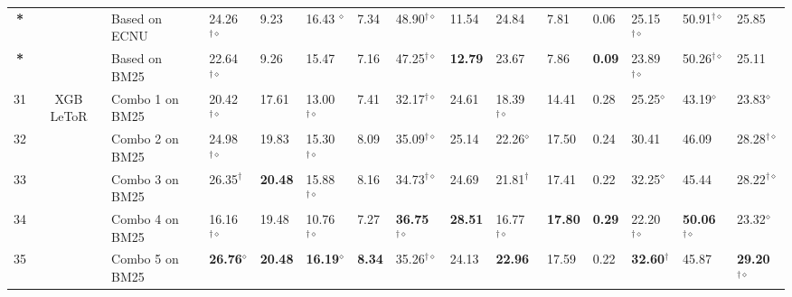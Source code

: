 \begin{table*}[ht!]
{\begin{tabular}{cclllllllllllll}
\textbf{*} &  & Based on ECNU  & 24.26$^{\dagger\diamond}$  & 9.23 & 16.43 $^{\diamond}$  & 7.34 & 48.90$^{\dagger\diamond}$  & 11.54 & 24.84  & 7.81 & 0.06 & 25.15$^{\dagger\diamond}$  & 50.91$^{\dagger\diamond}$  & 25.85\tabularnewline
\textbf{*} &  & Based on BM25  & 22.64$^{\dagger\diamond}$  & 9.26 & 15.47  & 7.16 & 47.25$^{\dagger\diamond}$  & \textbf{12.79} & 23.67  & 7.86 & \textbf{0.09} & 23.89$^{\dagger\diamond}$  & 50.26$^{\dagger\diamond}$  & 25.11\tabularnewline
\midrule 
31  & \multirow{5}{*}{XGB LeToR}  & Combo 1 on BM25  & 20.42$^{\dagger\diamond}$  & 17.61  & 13.00$^{\dagger\diamond}$  & 7.41  & 32.17$^{\dagger\diamond}$  & 24.61  & 18.39$^{\dagger\diamond}$  & 14.41  & 0.28  & 25.25$^{\diamond}$  & 43.19$^{\diamond}$  & 23.83$^{\diamond}$\tabularnewline
32  &  & Combo 2 on BM25  & 24.98$^{\dagger\diamond}$  & 19.83  & 15.30$^{\dagger\diamond}$  & 8.09  & 35.09$^{\dagger\diamond}$  & 25.14  & 22.26$^{\diamond}$  & 17.50  & 0.24  & 30.41  & 46.09  & 28.28$^{\dagger\diamond}$ \tabularnewline
33  &  & Combo 3 on BM25  & 26.35$^{\dagger}$  & \textbf{20.48}  & 15.88$^{\dagger\diamond}$  & 8.16  & 34.73$^{\dagger\diamond}$  & 24.69  & 21.81$^{\dagger}$  & 17.41  & 0.22  & 32.25$^{\diamond}$  & 45.44  & 28.22$^{\dagger\diamond}$\tabularnewline
34  &  & Combo 4 on BM25  & 16.16$^{\dagger\diamond}$  & 19.48  & 10.76$^{\dagger\diamond}$  & 7.27  & \textbf{36.75}$^{\dagger\diamond}$  & \textbf{28.51}  & 16.77$^{\dagger\diamond}$  & \textbf{17.80}  & \textbf{0.29 }  & 22.20$^{\dagger\diamond}$  & \textbf{50.06}$^{\dagger\diamond}$  & 23.32$^{\diamond}$\tabularnewline
35  &  & Combo 5 on BM25  & \textbf{26.76}$^{\diamond}$  & \textbf{20.48}  & \textbf{16.19}$^{\diamond}$  & \textbf{8.34}  & 35.26$^{\dagger\diamond}$  & 24.13  & \textbf{22.96}  & 17.59  & 0.22  & \textbf{32.60}$^{\dagger}$  & 45.87  & \textbf{29.20}$^{\dagger\diamond}$\tabularnewline
\bottomrule
\end{tabular}
}
\end{table*}

